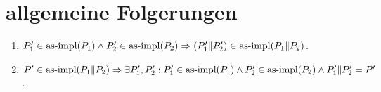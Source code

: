\chapter{allgemeine Folgerungen}

\begin{Lem}\mbox{}
  \begin{enumerate}
    \item $P'_1\in\mathrm{as}\text{-}\mathrm{impl} (P_1) \land P'_2 \in\mathrm{as}\text{-}\mathrm{impl} (P_2) \Rightarrow
      (P'_1\|P'_2) \in\mathrm{as}\text{-}\mathrm{impl} (P_1\|P_2)$.
    \item $P' \in\mathrm{as}\text{-}\mathrm{impl} (P_1\|P_2) \Rightarrow \exists P'_1,P'_2 : P'_1
      \in\mathrm{as}\text{-}\mathrm{impl} (P_1) \land P'_2 \in\mathrm{as}\text{-}\mathrm{impl} (P_2) \land P'_1\|P'_2=P'$.
  \end{enumerate}
\end{Lem}

